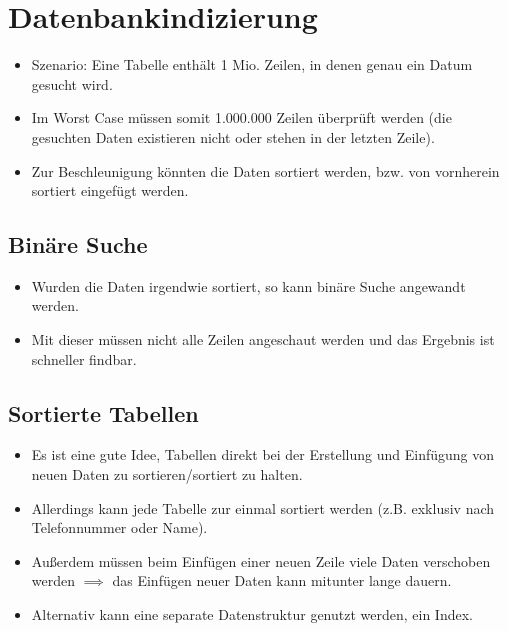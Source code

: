 \documentclass[a4paper, 11pt, accentcolor = tud3b]{tudreport}
\begin{document}
        \section{Datenbankindizierung} %
            \begin{itemize}
            	\item Szenario: Eine Tabelle enthält 1 Mio. Zeilen, in denen genau ein Datum gesucht wird.
            	\item Im Worst Case müssen somit 1.000.000 Zeilen überprüft werden (die gesuchten Daten existieren nicht oder stehen in der letzten Zeile).
            	\item Zur Beschleunigung könnten die Daten sortiert werden, bzw. von vornherein sortiert eingefügt werden.
            \end{itemize}

            \subsection{Binäre Suche} %
                \begin{itemize}
                	\item Wurden die Daten irgendwie sortiert, so kann binäre Suche angewandt werden.
                	\item Mit dieser müssen nicht alle Zeilen angeschaut werden und das Ergebnis ist schneller findbar.
                \end{itemize}

            \subsection{Sortierte Tabellen} %
                \begin{itemize}
                	\item Es ist eine gute Idee, Tabellen direkt bei der Erstellung und Einfügung von neuen Daten zu sortieren/sortiert zu halten.
                	\item Allerdings kann jede Tabelle zur einmal sortiert werden (z.B. exklusiv nach Telefonnummer oder Name).
                	\item Außerdem müssen beim Einfügen einer neuen Zeile viele Daten verschoben werden \( \implies \) das Einfügen neuer Daten kann mitunter lange dauern.
                	\item Alternativ kann eine separate Datenstruktur genutzt werden, ein Index.
                \end{itemize}
\end{document}
